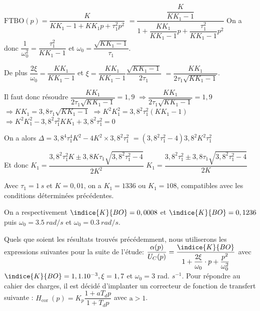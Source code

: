\ifprof
\begin{corrige}
$\text{FTBO}(p)= \dfrac{K}{K K_1-1+K K_1p+\tau_{1}^2 p^2}$ 
$= \dfrac{\dfrac{K}{K K_1-1}}{1+\dfrac{K K_1}{K K_1-1}p+\dfrac{\tau_{1}^2}{K K_1-1} p^2}$
On a donc $\dfrac{1}{\omega_0^2} = \dfrac{\tau_{1}^2}{K K_1-1}$ et  ${\omega_0} = \dfrac{\sqrt{K K_1-1}}{\tau_{1}}$.

De plus $\dfrac{2\xi}{\omega_0}= \dfrac{K K_1}{K K_1-1}$ et $\xi= \dfrac{K K_1}{K K_1-1} \dfrac{\sqrt{K K_1-1}}{2\tau_{1}}$ $= \dfrac{K K_1}{2\tau_1\sqrt{K K_1-1}} $.

Il faut donc résoudre $\dfrac{K K_1}{2\tau_1\sqrt{K K_1-1}} = 1,9$
$\Rightarrow \dfrac{K K_1}{2\tau_1\sqrt{K K_1-1}} = 1,9$
$\Rightarrow K K_1 = 3,8\tau_1\sqrt{K K_1-1}$
$\Rightarrow K^2 K_1^2 = 3,8^2\tau_1^2\left(K K_1-1\right)$
$\Rightarrow K^2 K_1^2 - 3,8^2\tau_1^2 K K_1 + 3,8^2\tau_1^2 = 0$


On a alors $\Delta = 3,8^4\tau_1^4 K^2 - 4 K^2 \times 3,8^2\tau_1^2 $
$= \left( 3,8^2\tau_1^2  - 4   \right)3,8^2K^2\tau_1^2$

Et donc $K_1 = \dfrac{3,8^2\tau_1^2 K \pm 3,8K\tau_1\sqrt{3,8^2\tau_1^2  - 4 }}{2K^2}$
$K_1 = \dfrac{3,8^2\tau_1^2  \pm 3,8\tau_1\sqrt{3,8^2\tau_1^2  - 4 }}{2K}$


Avec $\tau_1 = \SI{1}{s}$ et $K = 0,01$, on a 
$K_1 = 1336$ ou $K_1 = 108$, compatibles avec les conditions déterminées précédentes. 

On a respectivement $\indice{K}{BO} = 0,0008$ et $\indice{K}{BO} = 0,1236$ puis 
$\omega_0 = \SI{3,5}{rad/s}$ et  $\omega_0 = \SI{0,3}{rad/s}$.
\end{corrige}
\else
\fi

\ifprof
\else
Quels que soient les résultats trouvés précédemment, nous utiliserons les expressions suivantes pour la suite de l'étude: $\dfrac{\alpha(p)}{U_{C}(p)}=\dfrac{\indice{K}{BO}}{1+\dfrac{2  \xi}{\omega_{0}} \cdot p+\dfrac{p^{2}}{\omega_{0}^{2}}}$ avec $\indice{K}{B O}=1,1.10^{-3}, \xi=1,7$ et $\omega_{0}=3$ rad. $s^{-1}$. Pour répondre au cahier des charges, il est décidé d'implanter un correcteur de fonction de transfert suivante : $H_{\text {cor }}(p)=K_{p} \dfrac{1+a T_{d} p}{1+T_{d} p}$ avec $\mathrm{a}>1$.
\fi



